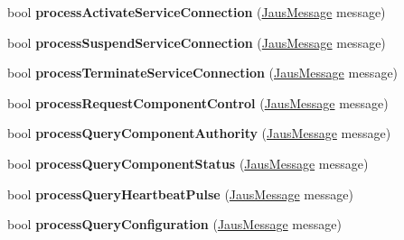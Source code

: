 \begin{DoxyCompactItemize}
\item 
\hypertarget{class_communicator_component_a149320d8136e78c74c1ca77490da2d20}{bool {\bfseries process\-Activate\-Service\-Connection} (\hyperlink{struct_jaus_message_struct}{\-Jaus\-Message} message)}\label{class_communicator_component_a149320d8136e78c74c1ca77490da2d20}

\item 
\hypertarget{class_communicator_component_af12387ea59e28cefbaac08e3063365a5}{bool {\bfseries process\-Suspend\-Service\-Connection} (\hyperlink{struct_jaus_message_struct}{\-Jaus\-Message} message)}\label{class_communicator_component_af12387ea59e28cefbaac08e3063365a5}

\item 
\hypertarget{class_communicator_component_a0bd24eeb2f7c30b77f0c51df50836bb2}{bool {\bfseries process\-Terminate\-Service\-Connection} (\hyperlink{struct_jaus_message_struct}{\-Jaus\-Message} message)}\label{class_communicator_component_a0bd24eeb2f7c30b77f0c51df50836bb2}

\item 
\hypertarget{class_communicator_component_a8f4b5da48e1344fbd86e6246bd53c70a}{bool {\bfseries process\-Request\-Component\-Control} (\hyperlink{struct_jaus_message_struct}{\-Jaus\-Message} message)}\label{class_communicator_component_a8f4b5da48e1344fbd86e6246bd53c70a}

\item 
\hypertarget{class_communicator_component_abb43f74615dc47447632a349e2d7890e}{bool {\bfseries process\-Query\-Component\-Authority} (\hyperlink{struct_jaus_message_struct}{\-Jaus\-Message} message)}\label{class_communicator_component_abb43f74615dc47447632a349e2d7890e}

\item 
\hypertarget{class_communicator_component_abfb1b3756e0bbc107b9e5cec53597bfd}{bool {\bfseries process\-Query\-Component\-Status} (\hyperlink{struct_jaus_message_struct}{\-Jaus\-Message} message)}\label{class_communicator_component_abfb1b3756e0bbc107b9e5cec53597bfd}

\item 
\hypertarget{class_communicator_component_afc4ff0804f3268ce32d32e2bd88d8e54}{bool {\bfseries process\-Query\-Heartbeat\-Pulse} (\hyperlink{struct_jaus_message_struct}{\-Jaus\-Message} message)}\label{class_communicator_component_afc4ff0804f3268ce32d32e2bd88d8e54}

\item 
\hypertarget{class_communicator_component_ab618b28281c8d24b74704b0d6d45a645}{bool {\bfseries process\-Query\-Configuration} (\hyperlink{struct_jaus_message_struct}{\-Jaus\-Message} message)}\label{class_communicator_component_ab618b28281c8d24b74704b0d6d45a645}


\end{DoxyCompactItemize}
